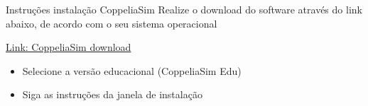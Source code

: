 
\begin{frame}[t]{Instruções instalação CoppeliaSim}
Realize o download do software através do link abaixo, de acordo com o seu sistema operacional

\vspace*{0.3cm}
\href{https://www.coppeliarobotics.com/downloads}{Link: CoppeliaSim download}
\vspace*{0.5cm}
\begin{itemize}
    \item Selecione a versão educacional (CoppeliaSim Edu)
    \item Siga as instruções da janela de instalação
\end{itemize}
\end{frame}


